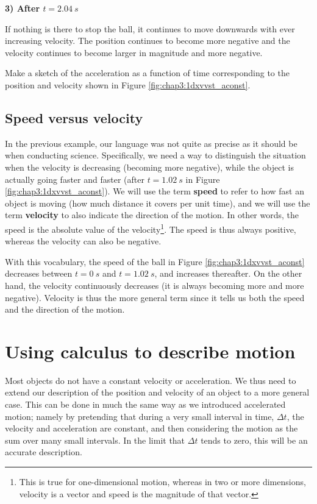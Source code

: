\textbf{3) After $t=\SI{2.04}{s}$}

If nothing is there to stop the ball, it continues to move downwards with ever increasing velocity. The position continues to become more negative and the velocity continues to become larger in magnitude and more negative.

\begin{checkpointSA}{Make a sketch of the acceleration as a function of time corresponding to the position and velocity shown in Figure \ref{fig:chap3:1dxvvst_aconst}.}
\end{checkpointSA}

\subsection{Speed versus velocity}
In the previous example, our language was not quite as precise as it should be when conducting science. Specifically, we need a way to distinguish the situation when the velocity is decreasing (becoming more negative), while the object is actually going faster and faster (after $t=\SI{1.02}{s}$ in Figure \ref{fig:chap3:1dxvvst_aconst}). We will use the term \textbf{speed} to refer to how fast an object is moving (how much distance it covers per unit time), and we will use the term \textbf{velocity} to also indicate the direction of the motion. In other words, the speed is the absolute value of the velocity\footnote{This is true for one-dimensional motion, whereas in two or more dimensions, velocity is a vector and speed is the magnitude of that vector.}. The speed is thus always positive, whereas the velocity can also be negative.

With this vocabulary, the speed of the ball in Figure \ref{fig:chap3:1dxvvst_aconst} decreases between $t=\SI{0}{s}$ and $t=\SI{1.02}{s}$, and increases thereafter. On the other hand, the velocity continuously decreases (it is always becoming more and more negative). Velocity is thus the more general term since it tells us both the speed and the direction of the motion. 

\section{Using calculus to describe motion}
Most objects do not have a constant velocity or acceleration. We thus need to extend our description of the position and velocity of an object to a more general case. This can be done in much the same way as we introduced accelerated motion; namely by pretending that during a very small interval in time, $\Delta t$, the velocity and acceleration are constant, and then considering the motion as the sum over many small intervals. In the limit that $\Delta t$ tends to zero, this will be an accurate description. 

